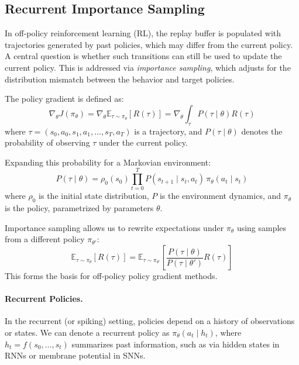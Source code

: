 \subsection{Recurrent Importance Sampling} \label{sup:recpolgrad}

In off-policy reinforcement learning (RL), the replay buffer is populated with trajectories generated by past policies, which may differ from the current policy. A central question is whether such transitions can still be used to update the current policy. This is addressed via \emph{importance sampling}, which adjusts for the distribution mismatch between the behavior and target policies.

The policy gradient is defined as:
\begin{equation}
    \nabla_{\theta} J(\pi_{\theta}) = \nabla_{\theta} \mathbb{E}_{\tau \sim \pi_{\theta}} \left[ R(\tau) \right]
    = \nabla_{\theta} \int_{\tau} P(\tau \mid \theta) R(\tau)
\end{equation}
where \( \tau = (s_0, a_0, s_1, a_1, \ldots, s_T, a_T) \) is a trajectory, and \( P(\tau \mid \theta) \) denotes the probability of observing \( \tau \) under the current policy.

Expanding this probability for a Markovian environment:
\begin{equation} \label{eq:transition}
    P(\tau \mid \theta) = \rho_0(s_0) \prod_{t=0}^{T} P(s_{t+1} \mid s_t, a_t)\, \pi_{\theta}(a_t \mid s_t)
\end{equation}
where \( \rho_0 \) is the initial state distribution, \( P \) is the environment dynamics, and \( \pi_{\theta} \) is the policy, parametrized by parameters \( \theta \).

Importance sampling allows us to rewrite expectations under \( \pi_{\theta} \) using samples from a different policy \( \pi_{\theta'} \):
\begin{equation} \label{eq:importance}
    \mathbb{E}_{\tau \sim \pi_{\theta}} \left[ R(\tau) \right] =
    \mathbb{E}_{\tau \sim \pi_{\theta'}} \left[
        \frac{P(\tau \mid \theta)}{P(\tau \mid \theta')} R(\tau)
    \right]
\end{equation}
This forms the basis for off-policy policy gradient methods.

\paragraph{Recurrent Policies.}
In the recurrent (or spiking) setting, policies depend on a history of observations or states. We can denote a recurrent policy as \( \pi_{\theta}(a_t \mid h_t) \), where \( h_t = f(s_0, \ldots, s_t) \) summarizes past information, such as via hidden states in RNNs or membrane potential in SNNs.

